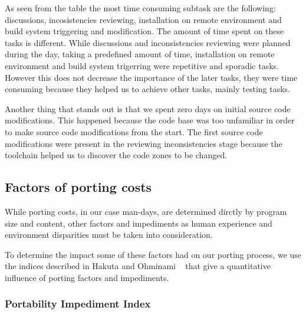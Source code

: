 As seen from the table the most time consuming subtask are the following:
discussions, incosistencies reviewing, installation on remote environment and
build system triggering and modification. The amount of time spent on these tasks is different. While
discussions and inconsistencies reviewing were planned during the day, taking
a predefined amount of time, installation on remote environment and build system trigerring
were repetitive and sporadic tasks. However this does not decrease the
importance of the later tasks, they were time consuming because they helped us
to achieve other tasks, mainly testing tasks.

Another thing that stands out is that we spent zero days on initial source code
modifications. This happened because the code base was too unfamiliar in order
to make source code modifications from the start. The first source code
modifications were present in the reviewing inconsistencies stage because the
toolchain helped us to discover the code zones to be changed.

\subsection{Factors of porting costs}

While porting costs, in our case man-days, are determined dirctly by program size and
content, other factors and impediments as human experience and environment
disparities must be taken into consideration.

To determine the impact some of these factors had on our porting process, we
use the indices described in Hakuta and Ohminami ~\cite{b2} that give
a quantitative influence of porting factors and impediments.

\subsubsection{Portability Impediment Index}

